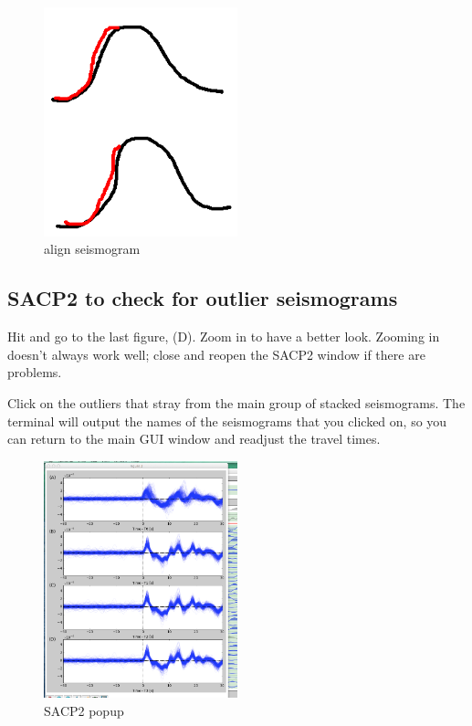 \documentclass[letterpaper,10pt]{article}
\begin{document}
\begin{figure}[h!]
  \centering
  \includegraphics[width=0.5\textwidth]{images/align_seismogram}
  \caption{align seismogram}
  \label{fig:align_seismogram}
\end{figure}


\subsection{SACP2 to check for outlier seismograms}

Hit  and go to the last figure, (D). Zoom in to have a better look. Zooming in doesn't always work well; close and reopen the SACP2 window if there are problems. 

Click on the outliers that stray from the main group of stacked seismograms. The terminal will output the names of the seismograms that you clicked on, so you can return to the main GUI window and readjust the travel times.

\begin{figure}[h!]
  \centering
  \includegraphics[width=0.5\textwidth]{images/SACP2_popup}
  \caption{SACP2 popup}
  \label{fig:SACP2_popup}
\end{figure}
\end{document}
